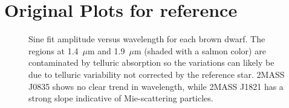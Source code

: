 \documentclass[manuscript]{aastex6}
\begin{document}
\clearpage
\section{Original Plots for reference}
\begin{figure}
\centering
{}
	\caption{Sine fit amplitude versus wavelength for each brown dwarf. The regions at 1.4~$\mu$m and 1.9~$\mu$m (shaded with a salmon color) are contaminated by telluric absorption so the variations can likely be due to telluric variability not corrected by the reference star. 2MASS J0835 shows no clear trend in wavelength, while 2MASS J1821 has a strong slope indicative of Mie-scattering particles.}
	\label{fig:ampSpec}
\end{figure} 


\end{document}
